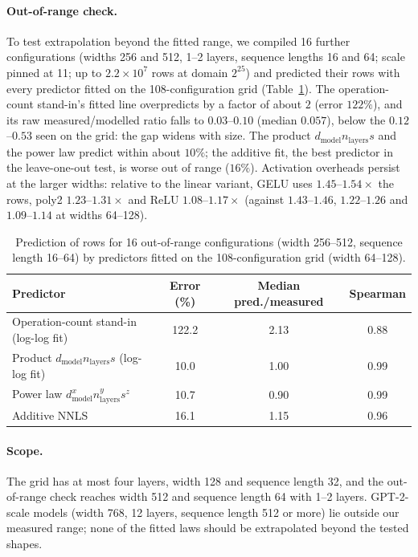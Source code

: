 \documentclass[10pt]{article}
\newcommand{\dmodel}{d_{\mathrm{model}}}
\newcommand{\nlayers}{n_{\mathrm{layers}}}
\begin{document}
\paragraph{Out-of-range check.}
To test extrapolation beyond the fitted range, we compiled 16 further
configurations (widths 256 and 512, 1--2 layers, sequence lengths 16 and 64;
scale pinned at 11; up to $2.2\times10^{7}$ rows at domain $2^{25}$) and predicted
their rows with every predictor fitted on the 108-configuration grid
(Table~\ref{tab:oor}). The operation-count stand-in's fitted line overpredicts by a factor of
about $2$ (error $122\%$), and its raw measured/modelled ratio falls to
$0.03$--$0.10$ (median $0.057$), below the $0.12$--$0.53$ seen on the grid: the gap
widens with size. The product $\dmodel\nlayers s$ and the power law predict
within about $10\%$; the additive fit, the best predictor in the leave-one-out
test, is worse out of range ($16\%$). Activation overheads persist at the larger
widths: relative to the linear variant, GELU uses $1.45$--$1.54\times$ the rows,
poly2 $1.23$--$1.31\times$ and ReLU $1.08$--$1.17\times$ (against $1.43$--$1.46$,
$1.22$--$1.26$ and $1.09$--$1.14$ at widths 64--128).

\begin{table}[t]
\centering
\caption{Prediction of rows for 16 out-of-range configurations (width 256--512,
  sequence length 16--64) by predictors fitted on the 108-configuration grid
  (width 64--128).}
\label{tab:oor}
\begin{tabular}{lccc}
\toprule
Predictor & Error (\%) & Median pred./measured & Spearman \\
\midrule
Operation-count stand-in (log-log fit) & 122.2 & 2.13 & 0.88 \\
Product $\dmodel\nlayers s$ (log-log fit) & 10.0 & 1.00 & 0.99 \\
Power law $\dmodel^{x}\nlayers^{y}s^{z}$ & 10.7 & 0.90 & 0.99 \\
Additive NNLS & 16.1 & 1.15 & 0.96 \\
\bottomrule
\end{tabular}
\end{table}

\paragraph{Scope.}
The grid has at most four layers, width 128 and sequence length 32, and the
out-of-range check reaches width 512 and sequence length 64 with 1--2 layers. GPT-2-scale models (width 768, 12 layers, sequence length 512 or more) lie
outside our measured range; none of the fitted laws should be extrapolated
beyond the tested shapes.
\end{document}
